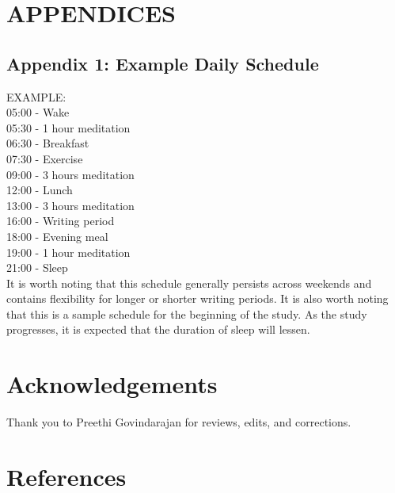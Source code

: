 \documentclass[a4paper, amsfonts, amssymb, amsmath, reprint, showkeys, nofootinbib, twoside]{revtex4-1}
\begin{document}
\section{APPENDICES}

\subsection{Appendix 1: Example Daily Schedule}

EXAMPLE: \\
05:00 - Wake \\
05:30 - 1 hour meditation \\
06:30 - Breakfast \\
07:30 - Exercise \\
09:00 - 3 hours meditation \\
12:00 - Lunch \\
13:00 - 3 hours meditation \\
16:00 - Writing period \\
18:00 - Evening meal \\
19:00 - 1 hour meditation \\
21:00 - Sleep \\

It is worth noting that this schedule generally persists across weekends and contains
flexibility for longer or shorter writing periods.
It is also worth noting that this is a sample schedule for the beginning of the study.
As the study progresses, it is expected that the duration of sleep will lessen.

\section*{Acknowledgements}

Thank you to Preethi Govindarajan for reviews, edits, and corrections.


\section*{References}

{}


% 
\end{document}

